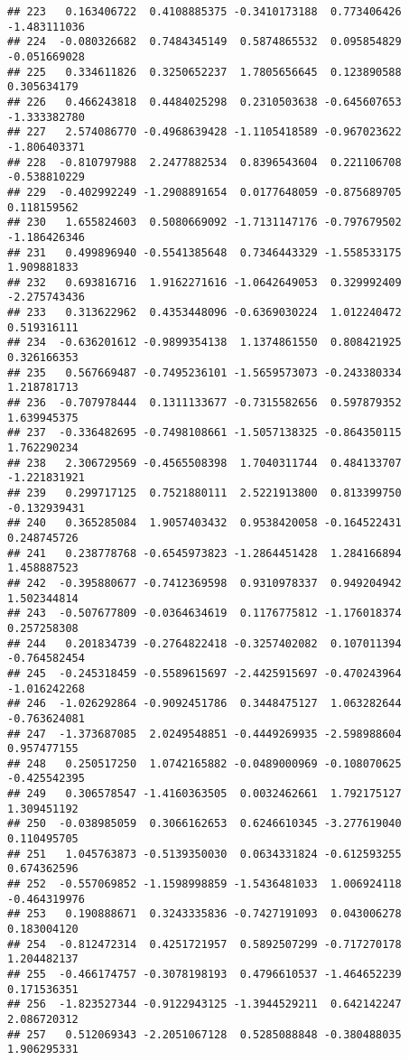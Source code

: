 \documentclass[
]{article}
\begin{document}
\begin{verbatim}
## 223   0.163406722  0.4108885375 -0.3410173188  0.773406426 -1.483111036
## 224  -0.080326682  0.7484345149  0.5874865532  0.095854829 -0.051669028
## 225   0.334611826  0.3250652237  1.7805656645  0.123890588  0.305634179
## 226   0.466243818  0.4484025298  0.2310503638 -0.645607653 -1.333382780
## 227   2.574086770 -0.4968639428 -1.1105418589 -0.967023622 -1.806403371
## 228  -0.810797988  2.2477882534  0.8396543604  0.221106708 -0.538810229
## 229  -0.402992249 -1.2908891654  0.0177648059 -0.875689705  0.118159562
## 230   1.655824603  0.5080669092 -1.7131147176 -0.797679502 -1.186426346
## 231   0.499896940 -0.5541385648  0.7346443329 -1.558533175  1.909881833
## 232   0.693816716  1.9162271616 -1.0642649053  0.329992409 -2.275743436
## 233   0.313622962  0.4353448096 -0.6369030224  1.012240472  0.519316111
## 234  -0.636201612 -0.9899354138  1.1374861550  0.808421925  0.326166353
## 235   0.567669487 -0.7495236101 -1.5659573073 -0.243380334  1.218781713
## 236  -0.707978444  0.1311133677 -0.7315582656  0.597879352  1.639945375
## 237  -0.336482695 -0.7498108661 -1.5057138325 -0.864350115  1.762290234
## 238   2.306729569 -0.4565508398  1.7040311744  0.484133707 -1.221831921
## 239   0.299717125  0.7521880111  2.5221913800  0.813399750 -0.132939431
## 240   0.365285084  1.9057403432  0.9538420058 -0.164522431  0.248745726
## 241   0.238778768 -0.6545973823 -1.2864451428  1.284166894  1.458887523
## 242  -0.395880677 -0.7412369598  0.9310978337  0.949204942  1.502344814
## 243  -0.507677809 -0.0364634619  0.1176775812 -1.176018374  0.257258308
## 244   0.201834739 -0.2764822418 -0.3257402082  0.107011394 -0.764582454
## 245  -0.245318459 -0.5589615697 -2.4425915697 -0.470243964 -1.016242268
## 246  -1.026292864 -0.9092451786  0.3448475127  1.063282644 -0.763624081
## 247  -1.373687085  2.0249548851 -0.4449269935 -2.598988604  0.957477155
## 248   0.250517250  1.0742165882 -0.0489000969 -0.108070625 -0.425542395
## 249   0.306578547 -1.4160363505  0.0032462661  1.792175127  1.309451192
## 250  -0.038985059  0.3066162653  0.6246610345 -3.277619040  0.110495705
## 251   1.045763873 -0.5139350030  0.0634331824 -0.612593255  0.674362596
## 252  -0.557069852 -1.1598998859 -1.5436481033  1.006924118 -0.464319976
## 253   0.190888671  0.3243335836 -0.7427191093  0.043006278  0.183004120
## 254  -0.812472314  0.4251721957  0.5892507299 -0.717270178  1.204482137
## 255  -0.466174757 -0.3078198193  0.4796610537 -1.464652239  0.171536351
## 256  -1.823527344 -0.9122943125 -1.3944529211  0.642142247  2.086720312
## 257   0.512069343 -2.2051067128  0.5285088848 -0.380488035  1.906295331

\end{verbatim}
\end{document}
